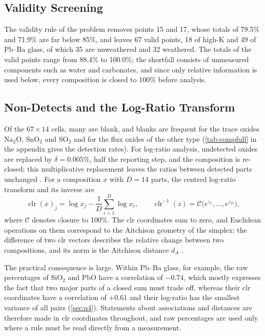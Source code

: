 \documentclass[11pt,a4paper]{article}
\newcommand{\clr}{\operatorname{clr}}
\newcommand{\ox}[1]{\ensuremath{\mathrm{#1}}}
\begin{document}
\subsection{Validity Screening}
The validity rule of the problem removes points 15 and 17, whose totals of 79.5\% and 71.9\% are far below 85\%, and leaves 67 valid points, 18 of high-K and 49 of Pb--Ba glass, of which 35 are unweathered and 32 weathered.
The totals of the valid points range from 88.4\% to 100.0\%; the shortfall consists of unmeasured components such as water and carbonates, and since only relative information is used below, every composition is closed to 100\% before analysis.

\subsection{Non-Detects and the Log-Ratio Transform}
Of the $67\times14$ cells, many are blank, and blanks are frequent for the trace oxides \ox{Na_2O}, \ox{SnO_2} and \ox{SO_2} and for the flux oxides of the other type (\cref{tab:compfull} in the appendix gives the detection rates).
For log-ratio analysis, undetected oxides are replaced by $\delta=0.005\%$, half the reporting step, and the composition is re-closed; this multiplicative replacement leaves the ratios between detected parts unchanged \citep{martin2003}.
For a composition $x$ with $D=14$ parts, the centred log-ratio transform and its inverse are
\begin{equation}\label{eq:clr}
\clr(x)_j = \log x_j - \frac{1}{D}\sum_{i=1}^{D}\log x_i ,\qquad
\clr^{-1}(z) = \mathcal{C}\big(e^{z_1},\dots,e^{z_D}\big),
\end{equation}
where $\mathcal{C}$ denotes closure to 100\%.
The clr coordinates sum to zero, and Euclidean operations on them correspond to the Aitchison geometry of the simplex: the difference of two clr vectors describes the relative change between two compositions, and its norm is the Aitchison distance $d_A$ \citep{aitchison1986,pawlowsky2015}.

The practical consequence is large.
Within Pb--Ba glass, for example, the raw percentages of \ox{SiO_2} and PbO have a correlation of $-0.74$, which mostly expresses the fact that two major parts of a closed sum must trade off, whereas their clr coordinates have a correlation of $+0.61$ and their log-ratio has the smallest variance of all pairs (\cref{sec:q4}).
Statements about associations and distances are therefore made in clr coordinates throughout, and raw percentages are used only where a rule must be read directly from a measurement.
\end{document}
